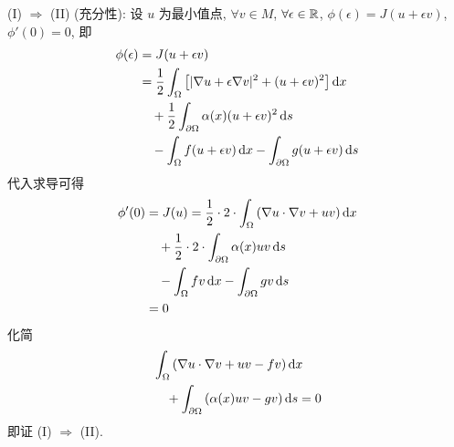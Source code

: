 \begin{solproof}[1]
(I) $\Rightarrow$ (II) (充分性):
设 $u$ 为最小值点, $\forall v \in M$, $\forall \epsilon \in {\mathbb R}$,
$\phi(\epsilon) = J(u + \epsilon v)$, $\phi'(0) = 0$, 即
\begin{align*}
\phi(\epsilon) &= J(u + \epsilon v) \\
&= \frac12 \int_\Omega 
    \left[ |\nabla u + \epsilon \nabla v|^2 + (u + \epsilon v)^2 \right]
    \operatorname{d\!} x \\
&\quad+ \frac12 \int_{\partial\Omega} \alpha(x) (u + \epsilon v)^2 \operatorname{d\!} s \\
&\quad- \int_\Omega f(u + \epsilon v) \operatorname{d\!} x
    - \int_{\partial\Omega} g(u + \epsilon v) \operatorname{d\!} s
\end{align*}
代入求导可得
\begin{align*}
\phi'(0) &= J(u) = \frac12\cdot 2\cdot \int_\Omega
    \left( \nabla u \cdot \nabla v + uv \right) \operatorname{d\!} x \\
&\quad+ \frac12\cdot 2\cdot \int_{\partial\Omega} \alpha(x)uv \operatorname{d\!} s \\
&\quad- \int_\Omega fv\operatorname{d\!} x - \int_{\partial\Omega} gv\operatorname{d\!} s \\
&= 0
\end{align*}
化简
\begin{align*}
&\int_\Omega \left( \nabla u \cdot \nabla v + uv -fv \right) \operatorname{d\!} x \\
&\quad+ \int_{\partial\Omega} \left( \alpha(x)uv - gv \right) \operatorname{d\!} s = 0
\end{align*}
即证 (I) $\Rightarrow$ (II).


\end{solproof}
